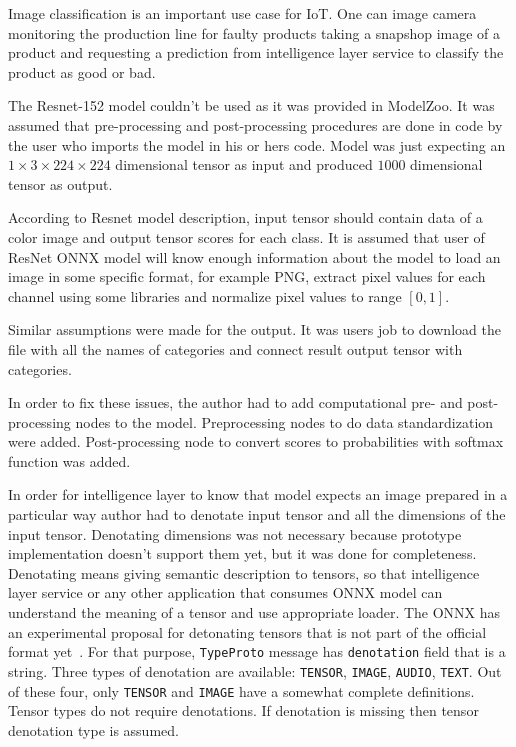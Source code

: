 \documentclass[english, 12pt, a4paper, elec, utf8, online]{aaltothesis}
\begin{document}
Image classification is an important use case for IoT. One can image camera monitoring the production line for faulty products taking a snapshop image of a product and requesting a prediction from intelligence layer service to classify the product as good or bad.        

The Resnet-152 model couldn't be used as it was provided in ModelZoo. It was assumed that pre-processing and post-processing procedures are done in code by the user who imports the model in his or hers code. Model was just expecting an $1 \times 3 \times 224 \times 224$ dimensional tensor as input and produced $1000$ dimensional tensor as output.

According to Resnet model description, input tensor should contain data of a color image and output tensor scores for each class. It is assumed that user of ResNet ONNX model will know enough information about the model to load an image in some specific format, for example PNG, extract pixel values for each channel using some libraries and normalize pixel values to range $[0,1]$. 

Similar assumptions were made for the output. It was users job to download the file with all the names of categories and connect result output tensor with categories. 

In order to fix these issues, the author had to add computational pre- and post-processing nodes to the model. Preprocessing nodes to do data standardization were added. Post-processing node to convert scores to probabilities with softmax function was added.

In order for intelligence layer to know that model expects an image prepared in a particular way author had to denotate input tensor and all the dimensions of the input tensor. Denotating dimensions was not necessary because prototype implementation doesn't support them yet, but it was done for completeness. Denotating means giving semantic description to tensors, so that intelligence layer service or any other application that consumes ONNX model can understand the meaning of a tensor and use appropriate loader. The ONNX has an experimental proposal for detonating tensors that is not part of the official format yet~\cite{onnx_denotations}. For that purpose, \texttt{TypeProto} message has \texttt{denotation} field that is a string. Three types of denotation are available: \texttt{TENSOR}, \texttt{IMAGE}, \texttt{AUDIO}, \texttt{TEXT}. Out of these four, only \texttt{TENSOR} and \texttt{IMAGE} have a somewhat complete definitions. Tensor types do not require denotations. If denotation is missing then tensor denotation type is assumed.
\end{document}
